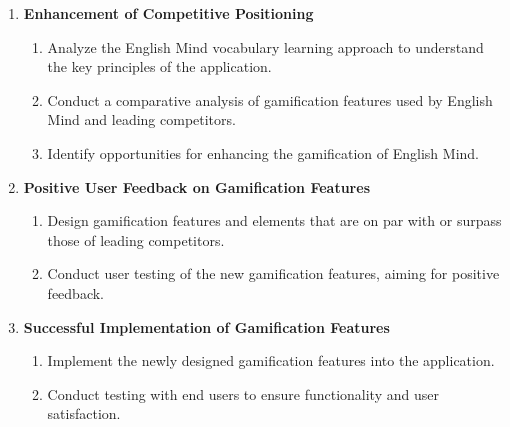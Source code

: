 \begin{enumerate}
    \item \textbf{Enhancement of Competitive Positioning}
    \begin{enumerate}
        \item Analyze the English Mind vocabulary learning approach to understand the key principles of the application.
        \item Conduct a comparative analysis of gamification features used by English Mind and leading competitors.
        \item Identify opportunities for enhancing the gamification of English Mind.
    \end{enumerate}

    \item \textbf{Positive User Feedback on Gamification Features}
    \begin{enumerate}
        \item Design gamification features and elements that are on par with or surpass those of leading competitors.
        \item Conduct user testing of the new gamification features, aiming for positive feedback.
    \end{enumerate}

    \item \textbf{Successful Implementation of Gamification Features}
    \begin{enumerate}
        \item Implement the newly designed gamification features into the application.
        \item Conduct testing with end users to ensure functionality and user satisfaction.
    \end{enumerate}
\end{enumerate}
